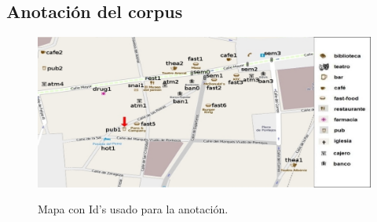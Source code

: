 \subsection{Anotaci\'on del corpus}
\label{corpus-anotacion}

\begin{figure}[H]
\centering
\includegraphics[width=\textwidth]{figures/mapa-con-ids2.png}\\[0pt]
\caption{Mapa con Id's usado para la anotaci\'on.}
\label{mapa-con-ids}
\end{figure}

